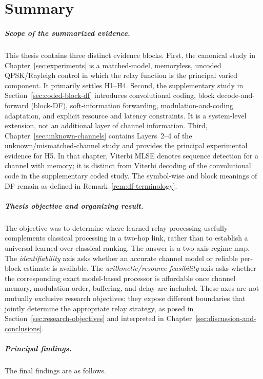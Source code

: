 \chapter{Summary}
\label{sec:summary}

\paragraph{Scope of the summarized evidence.}
This thesis contains three distinct evidence blocks.
First, the canonical study in Chapter~\ref{sec:experiments} is a
matched-model, memoryless, uncoded QPSK/Rayleigh control in which the relay
function is the principal varied component.  It primarily settles H1--H4.
Second, the supplementary study in
Section~\ref{sec:coded-block-df} introduces convolutional coding,
block decode-and-forward (block-DF), soft-information forwarding,
modulation-and-coding adaptation, and explicit resource and latency
constraints.  It is a system-level extension, not an additional layer of
channel information.  Third, Chapter~\ref{sec:unknown-channels} contains
Layers~2--4 of the unknown/mismatched-channel study and provides the
principal experimental evidence for H5.  In that chapter, Viterbi MLSE
denotes sequence detection for a channel with memory; it is distinct from
Viterbi decoding of the convolutional code in the supplementary coded
study.  The symbol-wise and block meanings of DF remain as defined in
Remark~\ref{rem:df-terminology}.

\paragraph{Thesis objective and organizing result.}
The objective was to determine where learned relay processing usefully
complements classical processing in a two-hop link, rather than to establish
a universal learned-over-classical ranking.  The answer is a two-axis regime
map.  The \emph{identifiability} axis asks whether an accurate channel model
or reliable per-block estimate is available.  The
\emph{arithmetic/resource-feasibility} axis asks whether the corresponding
exact model-based processor is affordable once channel memory, modulation
order, buffering, and delay are included.  These axes are not mutually
exclusive research objectives: they expose different boundaries that
jointly determine the appropriate relay strategy, as posed in
Section~\ref{sec:research-objectives} and interpreted in
Chapter~\ref{sec:discussion-and-conclusions}.

\paragraph{Principal findings.}
The final findings are as follows.

